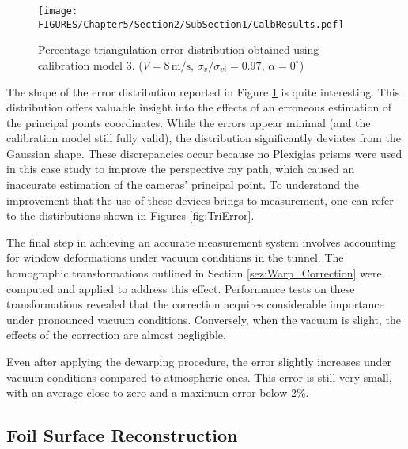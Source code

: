 \begin{figure}[htbp]
    \centering
    \texttt{[image: FIGURES/Chapter5/Section2/SubSection1/CalbResults.pdf]}
    \caption{Percentage triangulation error distribution obtained using calibration model 3. ($V = 8 \, \text{m/s}$, $\sigma_v/\sigma_{vi} = 0.97$, $\alpha = 0^\circ$)}
    \label{fig:CalbResults}
\end{figure}

The shape of the error distribution reported in Figure \ref{fig:CalbResults} is quite interesting. This distribution offers valuable insight into the effects of an erroneous estimation of the principal points coordinates.
While the errors appear minimal (and the calibration model still fully valid), the distribution significantly deviates from the Gaussian shape. 
These discrepancies occur because no Plexiglas prisms were used in this case study to improve the perspective ray path, which caused an inaccurate estimation of the cameras' principal point.  
To understand the improvement that the use of these devices brings to measurement, one can refer to the distirbutions shown in Figures \ref{fig:TriError}.

The final step in achieving an accurate measurement system involves accounting for window deformations under vacuum conditions in the tunnel. The homographic transformations outlined in Section \ref{sez:Warp_Correction} were computed and applied to address this effect. Performance tests on these transformations revealed that the correction acquires considerable importance under pronounced vacuum conditions. Conversely, when the vacuum is slight, the effects of the correction are almost negligible. 

Even after applying the dewarping procedure, the error slightly increases under vacuum conditions compared to atmospheric ones. This error is still very small, with an average close to zero and a maximum error below 2\%.

\subsection{Foil Surface Reconstruction}
\label{sez:Foil_Surf}

